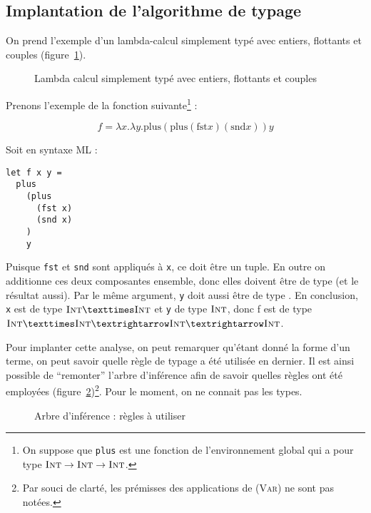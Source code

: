 \subsection{Implantation de l'algorithme de typage}

On prend l'exemple d'un lambda-calcul simplement typé avec entiers, flottants et
couples (figure~\ref{fig:stlc}).

\begin{figure}



\caption{Lambda calcul simplement typé avec entiers, flottants et couples}
\label{fig:stlc}

\end{figure}

Prenons l'exemple de la fonction suivante\footnote{ On suppose que \texttt{plus}
est une fonction de l'environnement global qui a pour type $\textsc{Int} \rightarrow
\textsc{Int} \rightarrow \textsc{Int}$.} :

\[
f = λx.λy. \textrm{plus} (\textrm{plus} (\textrm{fst} x) (\textrm{snd} x)) y
\]

Soit en syntaxe ML :

\begin{Verbatim}
let f x y =
  plus
    (plus
      (fst x)
      (snd x)
    )
    y
\end{Verbatim}

Puisque \texttt{fst} et \texttt{snd} sont appliqués à \texttt{x}, ce doit être
un tuple. En outre on additionne ces deux composantes ensemble, donc elles
doivent être de type \tInt (et le résultat aussi). Par le même argument,
\texttt{y} doit aussi être de type \tInt. En conclusion, \texttt{x} est de type
$\tInt × \tInt$ et \texttt{y} de type $\textsc{Int}$, donc f est de type $\tInt × \tInt
→ \tInt → \tInt$.

Pour implanter cette analyse, on peut remarquer qu'étant donné la forme d'un
terme, on peut savoir quelle règle de typage a été utilisée en dernier. Il est
ainsi possible de ``remonter'' l'arbre d'inférence afin de savoir quelles règles
ont été employées (figure~\ref{fig:inftree-rules})\footnote{Par souci de clarté,
les prémisses des applications de \textsc{(Var)} ne sont pas notées.}. Pour le
moment, on ne connait pas les types.


\begin{figure} %
\def\disptypeR#1#2{:#1}



\caption{Arbre d'inférence : règles à utiliser}
\label{fig:inftree-rules}
\end{figure} %

